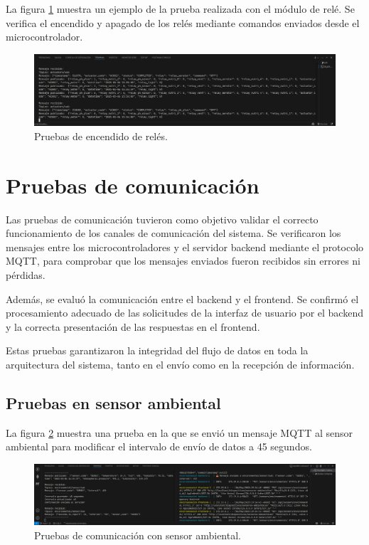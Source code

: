 La figura \ref{fig:prueba_rele_2} muestra un ejemplo de la prueba realizada con
el módulo de relé. Se verifica el encendido y apagado de los relés mediante
comandos enviados desde el microcontrolador.

\begin{figure}[H]
    \centering
    \includegraphics[width=\textwidth]{Images/54_actuadores_activacion.png}
    \caption[Pruebas de encendido de relés]{Pruebas de encendido de relés.}
    \label{fig:prueba_rele_2}
\end{figure}

\section{Pruebas de comunicación}

Las pruebas de comunicación tuvieron como objetivo validar el correcto
funcionamiento de los canales de comunicación del sistema. Se verificaron los
mensajes entre los microcontroladores y el servidor backend mediante el
protocolo MQTT, para comprobar que los mensajes enviados fueron recibidos sin
errores ni pérdidas.

Además, se evaluó la comunicación entre el backend y el frontend. Se confirmó
el procesamiento adecuado de las solicitudes de la interfaz de usuario por el
backend y la correcta presentación de las respuestas en el frontend.

Estas pruebas garantizaron la integridad del flujo de datos en toda la
arquitectura del sistema, tanto en el envío como en la recepción de
información.

\subsection{Pruebas en sensor ambiental}

La figura \ref{fig:prueba_mqtt_sensor_ambiental_1} muestra una prueba en la que
se envió un mensaje MQTT al sensor ambiental para modificar el intervalo de
envío de datos a 45 segundos.

\begin{figure}[H]
    \centering
    \includegraphics[width=\textwidth]{Images/55_prueba_mqtt_sensor_ambiental_1.png}
    \caption[Pruebas de comunicación con sensor ambiental]{Pruebas de comunicación con sensor ambiental.}
    \label{fig:prueba_mqtt_sensor_ambiental_1}
\end{figure}

